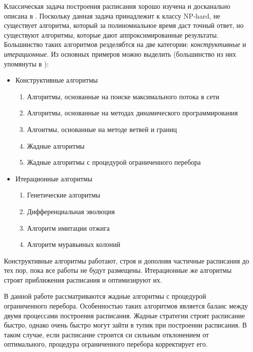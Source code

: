 Классическая задача построения расписания хорошо изучена и досканально описана в \cite{Coffman}. Поскольку данная задача принадлежит к классу NP-hard, не существует алгоритма, который за полиномиальное время даст точный ответ, но существуют алгоритмы, которые дают аппроксимированные результаты. Большинство таких алгоритмов резделябтся на две категории: \textit{конструктивные} и \textit{итерационные}. Из основных примеров можно выделить (большинство из них упомянуты в \cite{Kostenko_2017}):
\begin{itemize}
    \item Конструктивные алгоритмы
    \begin{enumerate}
        \item Алгоритмы, основанные на поиске максимального потока в сети
        \item Алгоритмы, основанные на методах динамического программирования
        \item Алгоитмы, основанные на методе ветвей и границ
        \item Жадные алгоритмы
        \item Жадные алгоритмы с процедурой ограниченного перебора
    \end{enumerate}
    \item Итерационные алгоритмы
    \begin{enumerate}
        \item Генетические алгоритмы
        \item Дифференциальная эволюция
        \item Алгоритм имитации отжига
        \item Алгоритм муравьиных колоний
    \end{enumerate}
\end{itemize}
\par
Конструктивные алгоритмы работают, строя и дополняя частичные расписания до тех пор, пока все работы не будут размещены. Итерационные же алгоритмы строят приближения расписания и оптимизируют их.
\par
В данной работе рассматриваются жадные алгоритмы с процедурой ограниченного перебора. Особенностью таких алгоритмов является баланс между двумя процессами построения расписания. Жадные стратегии строят расписание быстро, однако очень быстро могут зайти в тупик при построении расписания. В таком случае, если расписание строится си сильным отклонением от оптимального, процедура ограниченного перебора корректирует его.